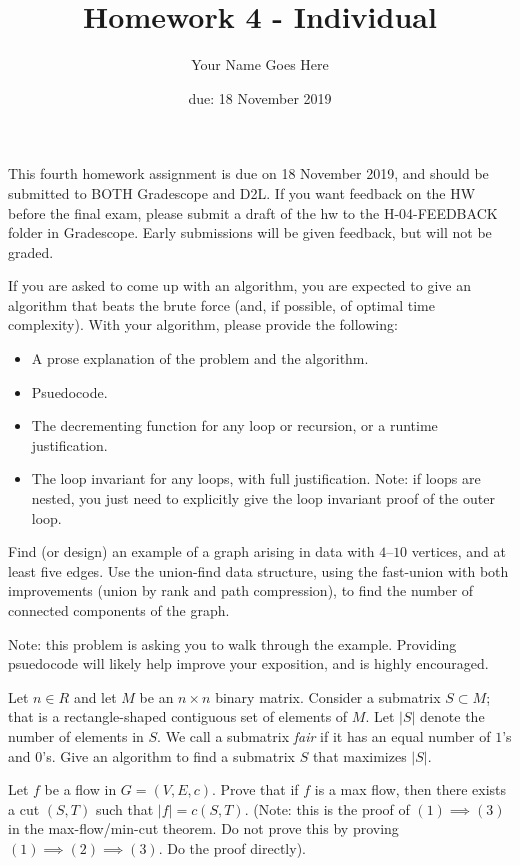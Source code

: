 \documentclass{article}
\author{Your Name Goes Here}
\date{due: 18 November 2019}
\title{Homework 4 - Individual}
\begin{document}
\maketitle

This fourth homework assignment is due on 18 November 2019, and should be
submitted to BOTH Gradescope and D2L.  If you want feedback on the HW before the
final exam, please submit a draft of the hw to the H-04-FEEDBACK folder in
Gradescope.  Early submissions will be given feedback, but will not be graded.

If you are asked to come up with an algorithm, you are expected to give an
algorithm that beats the brute force (and, if possible, of optimal time
complexity).
With your algorithm, please provide the following:
\begin{itemize}
    \item A prose explanation of the problem and the algorithm.
    \item Psuedocode.
    \item The decrementing function for any loop or recursion, or a runtime
        justification.
    \item The loop invariant for any loops, with full justification.  Note: if
        loops are nested, you just need to explicitly give the loop invariant
        proof of the outer loop.
\end{itemize}

\nextprob
Find (or design) an example of a graph arising in data
with $4$--$10$ vertices, and at least five
edges.  Use the union-find data structure, using the fast-union with both
improvements (union by rank and path compression), to find the number of
connected components of the graph.

Note: this problem is asking you to walk through the example.  Providing
psuedocode will likely help improve your exposition, and is highly encouraged.

\nextprob
Let $n \in R$ and let $M$ be an $n \times n$ binary matrix.  Consider a
submatrix $S \subset M$; that is a rectangle-shaped contiguous set of
elements of $M$.  Let $|S|$ denote the number of elements in $S$.  We call a
submatrix \emph{fair} if it has an equal number of $1$'s and $0$'s.  Give an
algorithm to find a submatrix $S$ that maximizes $|S|$.

\nextprob
Let $f$ be a flow in $G=(V,E,c)$.  Prove that if $f$ is a max flow, then there
exists a cut $(S,T)$ such that $|f| = c(S,T)$.  (Note: this is the proof of $(1)
\implies (3)$ in the max-flow/min-cut theorem.  Do not prove this by proving
$(1) \implies (2) \implies (3)$.  Do the proof directly).
\end{document}
